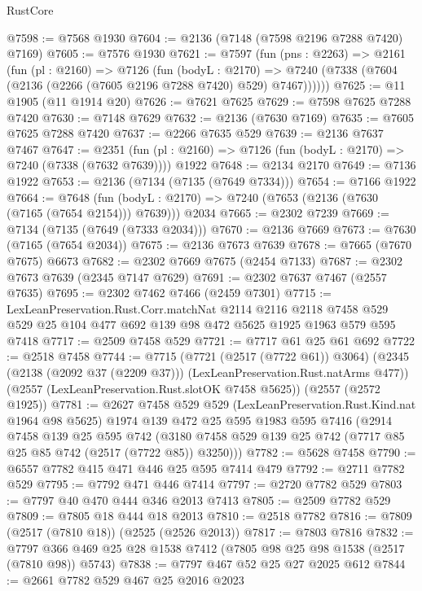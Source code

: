 \begin{lexlean}{RustCore}
\begin{coremodule}
@7598 := @7568 @1930
@7604 := @2136 (@7148 (@7598 @2196 @7288 @7420) @7169)
@7605 := @7576 @1930
@7621 := @7597
    (fun (pns : @2263) =>
    @2161
      (fun (pl : @2160) =>
      @7126
        (fun (bodyL : @2170) =>
        @7240 (@7338 (@7604 (@2136 (@2266 (@7605 @2196 @7288 @7420) @529) @7467))))))
@7625 := @11 @1905 (@11 @1914 @20)
@7626 := @7621 @7625
@7629 := @7598 @7625 @7288 @7420
@7630 := @7148 @7629
@7632 := @2136 (@7630 @7169)
@7635 := @7605 @7625 @7288 @7420
@7637 := @2266 @7635 @529
@7639 := @2136 @7637 @7467
@7647 := @2351
    (fun (pl : @2160) => @7126 (fun (bodyL : @2170) => @7240 (@7338 (@7632 @7639))))
    @1922
@7648 := @2134 @2170
@7649 := @7136 @1922
@7653 := @2136 (@7134 (@7135 (@7649 @7334)))
@7654 := @7166 @1922
@7664 := @7648
    (fun (bodyL : @2170) => @7240 (@7653 (@2136 (@7630 (@7165 (@7654 @2154))) @7639)))
    @2034
@7665 := @2302 @7239
@7669 := @7134 (@7135 (@7649 (@7333 @2034)))
@7670 := @2136 @7669
@7673 := @7630 (@7165 (@7654 @2034))
@7675 := @2136 @7673 @7639
@7678 := @7665 (@7670 @7675) @6673
@7682 := @2302 @7669 @7675 (@2454 @7133)
@7687 := @2302 @7673 @7639 (@2345 @7147 @7629)
@7691 := @2302 @7637 @7467 (@2557 @7635)
@7695 := @2302 @7462 @7466 (@2459 @7301)
@7715 := LexLeanPreservation.Rust.Corr.matchNat
    @2114
    @2116
    @2118
    @7458
    @529
    @529
    @25
    @104
    @477
    @692
    @139
    @98
    @472
    @5625
    @1925
    @1963
    @579
    @595
    @7418
@7717 := @2509 @7458 @529
@7721 := @7717 @61 @25 @61 @692
@7722 := @2518 @7458
@7744 := @7715
    (@7721 (@2517 (@7722 @61)) @3064)
    (@2345 (@2138 (@2092 @37 (@2209 @37))) (LexLeanPreservation.Rust.natArms @477))
    (@2557 (LexLeanPreservation.Rust.slotOK @7458 @5625))
    (@2557 (@2572 @1925))
@7781 := @2627
    @7458
    @529
    @529
    (LexLeanPreservation.Rust.Kind.nat @1964 @98 @5625)
    @1974
    @139
    @472
    @25
    @595
    @1983
    @595
    @7416
    (@2914
      @7458
      @139
      @25
      @595
      @742
      (@3180 @7458 @529 @139 @25 @742 (@7717 @85 @25 @85 @742 (@2517 (@7722 @85)) @3250)))
@7782 := @5628 @7458
@7790 := @6557 @7782 @415 @471 @446 @25 @595 @7414 @479
@7792 := @2711 @7782 @529
@7795 := @7792 @471 @446 @7414
@7797 := @2720 @7782 @529
@7803 := @7797 @40 @470 @444 @346 @2013 @7413
@7805 := @2509 @7782 @529
@7809 := @7805 @18 @444 @18 @2013
@7810 := @2518 @7782
@7816 := @7809 (@2517 (@7810 @18)) (@2525 (@2526 @2013))
@7817 := @7803 @7816
@7832 := @7797 @366 @469 @25 @28 @1538 @7412 (@7805 @98 @25 @98 @1538 (@2517 (@7810 @98)) @5743)
@7838 := @7797 @467 @52 @25 @27 @2025 @612
@7844 := @2661 @7782 @529 @467 @25 @2016 @2023

\end{coremodule}
\end{lexlean}

